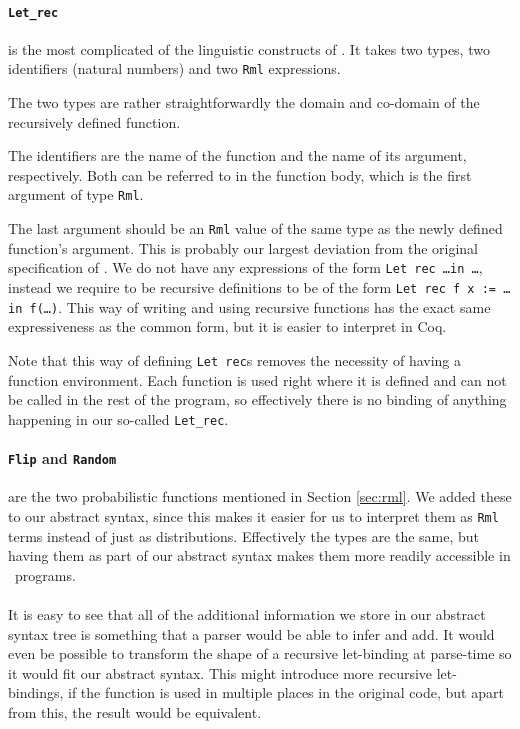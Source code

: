 \documentclass[11pt, leqno, titlepage]{article}
\def\coqe{\lstinline[language=Coq, basicstyle=\small]}
\theoremstyle{definition}
\begin{document}
\paragraph{\coqe{Let_rec}} is the most complicated of the linguistic constructs of
\rmlx. It takes two types, two identifiers (natural numbers) and two \coqe{Rml}
expressions.

The two types are rather straightforwardly the domain and co-domain of the
recursively defined function.

The identifiers are the name of the function and the name of its argument,
respectively. Both can be referred to in the function body, which is the first
argument of type \coqe{Rml}.

The last argument should be an \coqe{Rml} value of the same type as the newly defined
function's argument. This is probably our largest deviation from the original
specification of \rml. We do not have any expressions of the form \texttt{Let rec
  \dots in \dots}, instead we require to be recursive definitions to be of the form
\texttt{Let rec f x := \dots in f(\dots)}. This way of writing and using recursive
functions has the exact same expressiveness as the common form, but it is easier to
interpret in Coq.

Note that this way of defining \texttt{Let rec}s removes the necessity of having a
function environment. Each function is used right where it is defined and can not be
called in the rest of the program, so effectively there is no binding of anything
happening in our so-called \coqe{Let_rec}. 

\paragraph{\coqe{Flip} and \coqe{Random}} are the two probabilistic functions
mentioned in Section \ref{sec:rml}. We added these to our abstract syntax, since this
makes it easier for us to interpret them as \coqe{Rml} terms instead of just as
distributions. Effectively the types are the same, but having them as part of our
abstract syntax makes them more readily accessible in \rmlx\ programs. \\
\\
It is easy to see that all of the additional information we store in our abstract
syntax tree is something that a parser would be able to infer and add. It would even
be possible to transform the shape of a recursive let-binding at parse-time so it
would fit our abstract syntax. This might introduce more recursive let-bindings, if
the function is used in multiple places in the original code, but apart from this,
the result would be equivalent. 
\end{document}

